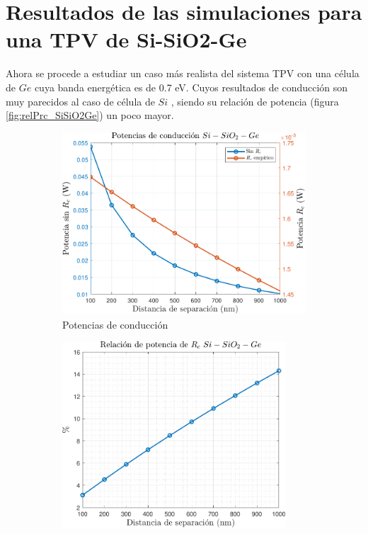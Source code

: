 \section{Resultados de las simulaciones para una TPV de Si-SiO2-Ge}
Ahora se procede a estudiar un caso más realista del sistema TPV con una célula de $Ge$ cuya banda energética es de 0.7 eV. Cuyos resultados de conducción son muy parecidos al caso de célula de $Si$ , siendo su relación de potencia (figura \ref{fig:relPrc_SiSiO2Ge}) un poco mayor.
\begin{figure}[H]
	\centering
	\begin{subfigure}[b]{0.49\textwidth}
		\centering
		\includegraphics[width=1.00\textwidth]{figuras/Resultados/conduccion/pdf/Prc2_SiSiO2Ge.pdf}
		\caption{Potencias de conducción}
		\label{fig:Prc_SiSiO2Ge}
	\end{subfigure}
	\hfill
	\begin{subfigure}[b]{0.49\textwidth}
		\centering
		\includegraphics[width=0.92\textwidth]{figuras/Resultados/conduccion/pdf/relPrc_SiSiO2Ge.pdf}

\end{subfigure}
\end{figure}
